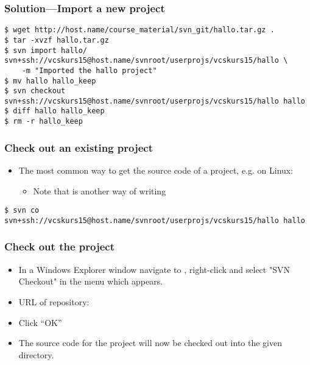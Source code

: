 \begin{frame}[fragile]
\frametitle{Solution---Import a new project}
\linuxframe
\begin{lstlisting}[basicstyle=\tiny\ttfamily\color{black}]
$ wget http://host.name/course_material/svn_git/hallo.tar.gz .
$ tar -xvzf hallo.tar.gz
$ svn import hallo/ svn+ssh://vcskurs15@host.name/svnroot/userprojs/vcskurs15/hallo \
    -m "Imported the hallo project"
$ mv hallo hallo_keep
$ svn checkout svn+ssh://vcskurs15@host.name/svnroot/userprojs/vcskurs15/hallo hallo
$ diff hallo hallo_keep
$ rm -r hallo_keep
\end{lstlisting}
\end{frame}

\begin{frame}[fragile]
    \frametitle{Check out an existing project}
    \linuxframe
    \begin{itemize}
	\item The most common way to get the source code of a project, e.g.
        on Linux:
        \begin{itemize}
            \item Note that  is another way of writing
                \ttalert{svn checkout}
        \end{itemize}
    \end{itemize}
\begin{lstlisting}[basicstyle=\tiny\ttfamily\color{black}]
$ svn co svn+ssh://vcskurs15@host.name/svnroot/userprojs/vcskurs15/hallo hallo
\end{lstlisting}
\end{frame}

\begin{frame}
    \frametitle{Check out the project}
    \begin{itemize}
	\item In a Windows Explorer window navigate to
	    ,
	    right-click and select "SVN Checkout" in the menu which appears.
	\item URL of repository:
	\item Click \enquote{OK}
	\item The source code for the project will now be checked out into the
	    given directory.
    \end{itemize}
\end{frame}

